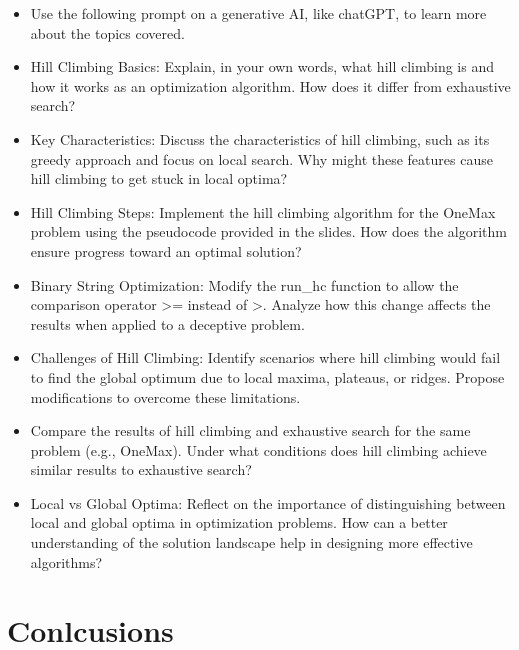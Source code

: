 \documentclass[
  letterpaper,
  DIV=11,
  numbers=noendperiod]{scrreprt}
\providecommand{\tightlist}{%
  \setlength{\itemsep}{0pt}\setlength{\parskip}{0pt}}\usepackage{longtable,booktabs,array}
\begin{document}
\begin{itemize}
\tightlist
\item
  Use the following prompt on a generative AI, like chatGPT, to learn
  more about the topics covered.
\item
  Hill Climbing Basics: Explain, in your own words, what hill climbing
  is and how it works as an optimization algorithm. How does it differ
  from exhaustive search?
\item
  Key Characteristics: Discuss the characteristics of hill climbing,
  such as its greedy approach and focus on local search. Why might these
  features cause hill climbing to get stuck in local optima?
\item
  Hill Climbing Steps: Implement the hill climbing algorithm for the
  OneMax problem using the pseudocode provided in the slides. How does
  the algorithm ensure progress toward an optimal solution?
\item
  Binary String Optimization: Modify the run\_hc function to allow the
  comparison operator \textgreater= instead of \textgreater. Analyze how
  this change affects the results when applied to a deceptive problem.
\item
  Challenges of Hill Climbing: Identify scenarios where hill climbing
  would fail to find the global optimum due to local maxima, plateaus,
  or ridges. Propose modifications to overcome these limitations.
\item
  Compare the results of hill climbing and exhaustive search for the
  same problem (e.g., OneMax). Under what conditions does hill climbing
  achieve similar results to exhaustive search?
\item
  Local vs Global Optima: Reflect on the importance of distinguishing
  between local and global optima in optimization problems. How can a
  better understanding of the solution landscape help in designing more
  effective algorithms?
\end{itemize}


\chapter{Conlcusions}\label{conlcusions}
\end{document}
